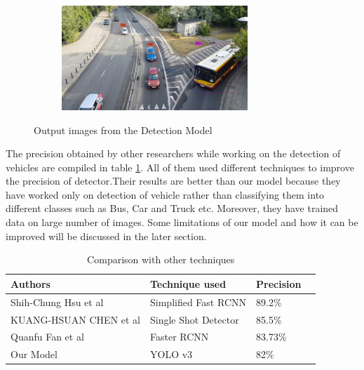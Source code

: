 \begin{figure}
    \quad
    \begin{subfigure}[t]{0.475\textwidth}   
        \centering 
        \includegraphics[width = 7cm, height = 5 cm]{CHAPTERS/Chapter-5/images/5.12d.jpg}
        \caption[]%
        {{\small }}    
        \label{fig:mean and std of net44}
    \end{subfigure}
    \caption[Output images from the Detection Model]
    {\small Output images from the Detection Model}
    \label{fig:5.12}
\end{figure}
 The precision obtained by other researchers while working on the detection of vehicles are 
 compiled in table \ref{table:5.3}.  All of them used different techniques to improve the precision of detector.Their results are better than our model because they have worked only on detection of vehicle rather than classifying them into different classes such as Bus, Car and Truck etc. Moreover, they have trained data on large number of images. Some limitations of our model and how it can be improved will be discussed in the later section.
 \begin{table}[H]
    \caption{Comparison with other techniques}
    \label{table:5.3}
      \begin{center}
        \scalebox{1.1}
        {\begin{tabular}{|l |l |l |l |}
        \hline
        Authors  & Technique used &  Precision
        \\ \hline
        Shih-Chung Hsu et al \cite{chap_5_article:4} & Simplified Fast RCNN & 89.2\%
        \\ \hline
        KUANG-HSUAN CHEN et al \cite{chap_5_article:5} & Single Shot Detector & 85.5\%
        \\ \hline  
        Quanfu Fan et al \cite{chap_5_article:6} & Faster RCNN & 83.73\%
        \\ \hline
        Our Model & YOLO v3 & 82\%
        \\ \hline
        
        \end{tabular}}
      \end{center}
\end{table}


